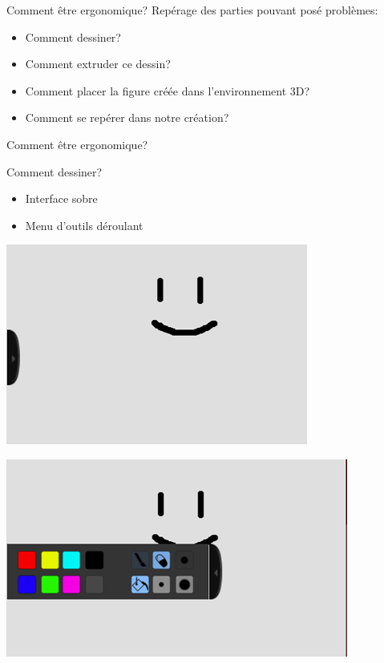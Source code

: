 \documentclass[a4paper,10pt]{beamer}
\begin{document}
		
		\begin{frame}{Comment être ergonomique?}
				Repérage des parties pouvant posé problèmes:
				
				\begin{itemize}
					\item Comment dessiner?
					\item Comment extruder ce dessin?
					\item Comment placer la figure créée dans l'environnement 3D?
					\item Comment se repérer dans notre création?
				\end{itemize}
		\end{frame}	
		
		\begin{frame}{Comment être ergonomique?}

				Comment dessiner?
					\begin{itemize}
						\item Interface sobre
						\item Menu d'outils déroulant
					\end{itemize}
				
				\centerline{\includegraphics[scale=0.3]{images/Nono/img1.png}} \centerline{\includegraphics[scale=0.3]{images/Nono/img2.png}}
			


		\end{frame}	
		
\end{document}
